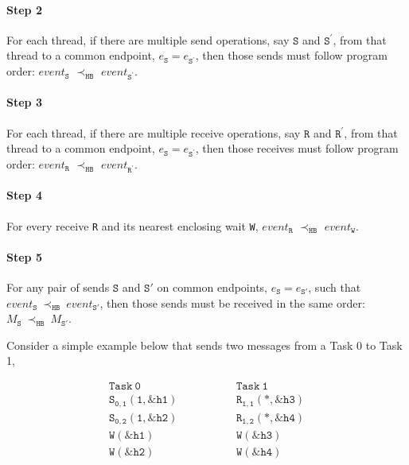 \paragraph*{Step 2} For each thread, if there are multiple send
operations, say $\mathtt{S}$ and $\mathtt{S^\prime}$, from that thread
to a common endpoint, $e_\mathtt{S} = e_\mathtt{S^\prime}$, then those
sends must follow program order: $\mathit{event}_\mathtt{S}$
$\prec_\mathtt{HB}$ $\mathit{event}_\mathtt{S^\prime}$.

\paragraph*{Step 3} For each thread, if there are multiple receive
operations, say $\mathtt{R}$ and $\mathtt{R^\prime}$, from that thread
to a common endpoint, $e_\mathtt{S} = e_\mathtt{S^\prime}$, then those
receives must follow program order: $\mathit{event}_\mathtt{R}$
$\prec_\mathtt{HB}$ $\mathit{event}_\mathtt{R^\prime}$.

\paragraph*{Step 4} For every receive \texttt{R} and its nearest
enclosing wait \texttt{W}, $\mathit{event}_\mathtt{R}$
$\prec_\mathtt{HB}$ $\mathit{event}_\mathtt{W}$.

\paragraph*{Step 5} For any pair of sends $\mathtt{S}$ and
$\mathtt{S'}$ on common endpoints, $e_{\mathtt{S}}=e_{\mathtt{S'}}$,
such that
$\mathit{event}_\mathtt{S}\ \mathrm{\prec_\mathtt{HB}}\ \mathit{event}_\mathtt{S'}$,
then those sends must be received in the same order:
$M_{\mathtt{S}}\ \mathrm{\prec_{\mathtt{HB}}}\ M_{\mathtt{S'}}$.

Consider a simple example below that sends two messages from a Task 0
to Task 1,

\[
\begin{array}{l|l}
\;\;\;\;\;\;\;\;\mathtt{Task\ 0}\;\;\;\;\;\;\;\; & \;\;\;\;\;\;\;\; \mathtt{Task\ 1}\;\;\;\;\;\;\;\; \\
\hline
\;\;\;\;\;\;\;\;\mathtt{S_{0,1}(1,\&h1)}\;\;\;\;\;\;\;\; & \;\;\;\;\;\;\;\; \mathtt{R_{1,1}(*,\&h3)}\;\;\;\;\;\;\;\; \\
\;\;\;\;\;\;\;\;\mathtt{S_{0,2}(1,\&h2)}\;\;\;\;\;\;\;\; & \;\;\;\;\;\;\;\; \mathtt{R_{1,2}(*,\&h4)}\;\;\;\;\;\;\;\; \\
\;\;\;\;\;\;\;\;\mathtt{W(\&h1)}\;\;\;\;\;\;\;\; & \;\;\;\;\;\;\;\; \mathtt{W(\&h3)}\;\;\;\;\;\;\;\; \\
\;\;\;\;\;\;\;\;\mathtt{W(\&h2)}\;\;\;\;\;\;\;\; & \;\;\;\;\;\;\;\; \mathtt{W(\&h4)}\;\;\;\;\;\;\;\; \\
\end{array}
\]

